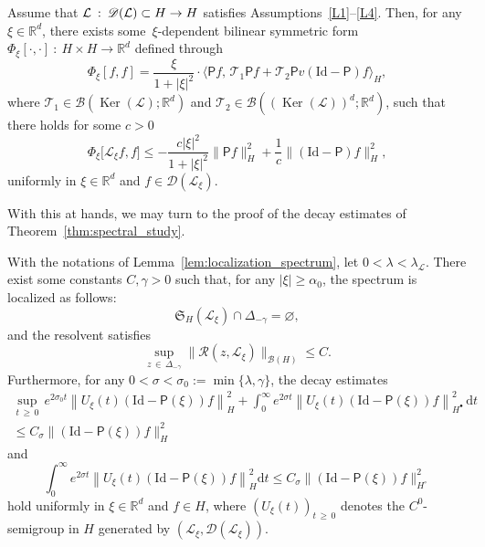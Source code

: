 \documentclass[AHL,Unicode,longabstracts,published]{cedram}
\DeclareMathOperator{\nul}{Ker}
\newcommand{\Id}{\mathrm{Id}}
\renewcommand{\d}{\mathrm{d}}
\newcommand{\R}{\mathbb{R}}
\newcommand{\fkS}{\mathfrak{S}}
\newcommand{\LL}{\mathcal{L}}
\newcommand{\PP}{\mathsf{P}}
\newcommand{\RR}{\mathcal{R}}
\newcommand{\TT}{\mathcal{T}}
\newcommand{\dom}{\mathscr{D}}
\newcommand{\BBB}{\mathscr{B}}
\newcommand{\Ss}{H}
\newcommand{\Ssp}{H^{\bullet}}
\newcommand{\Ssm}{H^{\circ}}
\renewcommand*\le{\leqslant}
\renewcommand*\ge{\geqslant}
\renewcommand*\geq{\geqslant}
\newcommand{\la}{\langle}
\newcommand{\ra}{\rangle}
\begin{document}
\begin{lemm}\label{lem:lemhypocoercivity}
Assume that $\LL\::\:\dom(\LL)\linebreak \subset \Ss \to \Ss$ satisfies Assumptions~\eqref{L1}--\eqref{L4}. Then, for any $\xi \in\R^{d}$, there exists some~$\xi$-dependent bilinear symmetric form $\Phi_\xi[\cdot, \cdot]\::\:\Ss\times \Ss \to \R^{d}$ defined through
\[
\Phi_\xi\left[f, f\right] = \frac{\xi}{1 + | \xi |^2} \cdot \Big\la \PP f, \, \TT_1 \PP f + \TT_2 \PP v \left(\Id - \PP \right) f \Big\ra_{\Ss},
\]
where $\TT_1 \in \BBB(\nul(\LL) ; \R^d )$ and $\TT_2 \in \BBB((\nul(\LL))^d ; \R^d )$, such that there holds for some $c > 0$
\begin{equation}\label{eq:hypocoercivity}
\Phi_\xi\Big[\LL_{\xi} f, f\Big] \le - \frac{ c | \xi |^2 }{1 + | \xi |^2 } \| \PP f \|^2_{\Ss} + \frac{1}{c} \| (\Id - \PP) f \|_{\Ss}^2,
\end{equation}
uniformly in $\xi \in \R^d$ and $f \in \dom(\LL_\xi)$.
\end{lemm}

With this at hands, we may turn to the proof of the decay estimates of Theorem~\ref{thm:spectral_study}.

\begin{lemm}\label{lem:spectral_decay}
With the notations of Lemma~\ref{lem:localization_spectrum}, let $0 < \lambda < \lambda_\LL$. There exist some constants $C, \gamma > 0$ such that, for any $|\xi| \ge \alpha_{0}$, the spectrum is localized as follows:
\[
\fkS_{\Ss}(\LL_\xi) \cap \Delta_{-\gamma} = \varnothing,
\]
and the resolvent satisfies
\[
\sup_{z\,\in\,\Delta_{-\gamma}} \| \RR(z,\LL_{\xi}) \|_{\BBB(\Ss)} \le C.
\]
Furthermore, for any $0 < \sigma < \sigma_0 := \min\{\lambda, \gamma\}$, the decay estimates
\begin{multline*}
\sup_{t\,\ge\,0} \,e^{2 \sigma_0 t} \left\| U_{\xi}(t) {\left(\Id - \PP(\xi) \right)} f \right\|^2_{\Ss} + \int_0^\infty e^{2 \sigma t} \left\| U_{\xi}(t) {\left(\Id - \PP(\xi) \right)}f \right\|_{\Ssp}^2 \, \d t \\
\le C_{\sigma}\| \left(\Id - \PP(\xi) \right)f \|^2_{\Ss}
\end{multline*}
and
\[
\int_{0}^{\infty} e^{2\sigma t} \left\|U_{\xi}(t) {\left(\Id-\PP(\xi)\right)}f\right\|_{\Ss}^{2}\d t \le C_{\sigma}\|{\left(\Id-\PP(\xi)\right)}f\|_{\Ssm}^{2}
\]
hold uniformly in $\xi \in \R^{d}$ and $f \in {\Ss}$, where $(U_{\xi}(t))_{t\,\geq\,0}$ denotes the $C^{0}$-semigroup in $\Ss$ generated by $(\LL_{\xi},\dom(\LL_{\xi}))$.
\end{lemm}
\end{document}
